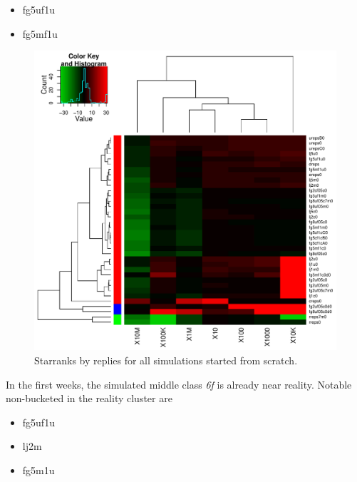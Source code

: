 \documentclass[10pt,oneside]{memoir}
\begin{document}
\begin{Spacing}{2}
\begin{itemize}
\item fg5uf1u

\item fg5mf1u
\end{itemize}


\begin{figure}
\begin{center}
    \includegraphics{figures/crop/heatmap-sbucks-reps-star-med-medians-0wk}
    \caption{Starranks by replies for all simulations started from scratch.}
    \label{figure:heatmap-sbucks-reps-star-med-medians-0wk}
\end{center}
\end{figure}
In the first weeks, the simulated middle class {\itshape 6f} is already near reality.
Notable non-bucketed in the reality cluster are


\begin{itemize}


\item fg5uf1u

\item lj2m

\item fg5m1u
\end{itemize}



\end{Spacing}
\end{document}
